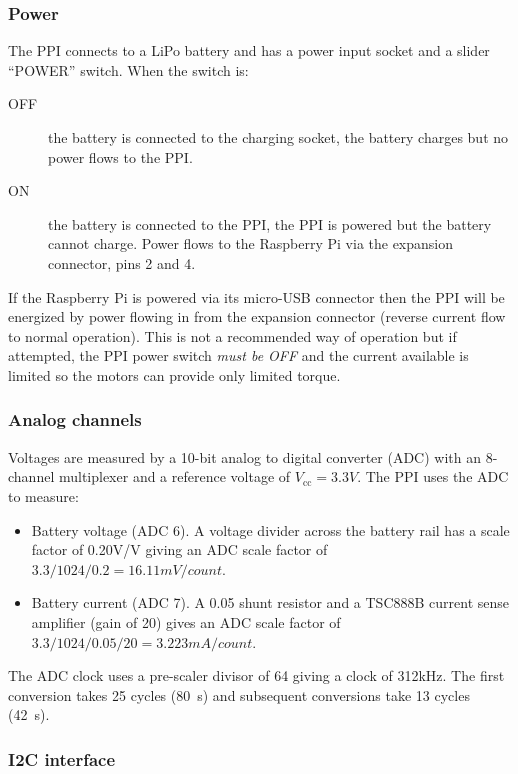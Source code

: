 \documentclass[11pt,fleqn]{article}
\begin{document}
\subsubsection{Power}
The PPI connects to a LiPo battery and has a power input socket and a slider ``POWER'' switch.
When the switch is:
\begin{description}
\item[OFF]  the battery is connected to the charging socket, the battery charges but no power flows to the PPI.
\item[ON]   the battery is connected to the PPI, the PPI is powered but the battery cannot charge.  Power flows to the Raspberry Pi via the expansion connector, pins 2 and 4.
\end{description}

If the Raspberry Pi is powered via its micro-USB connector then the PPI will  be energized by power flowing in from the expansion connector (reverse current flow to normal operation).
This is not a recommended way of operation but if attempted, the PPI power switch \emph{must be OFF} and the current available is limited so the motors can provide only limited torque.



\subsubsection{Analog channels}
Voltages are measured by a 10-bit analog to digital converter (ADC) with an 8-channel multiplexer and a reference voltage of $V_{\mbox{cc}} =3.3\unit{V}$.  The PPI uses the ADC to measure:
\begin{itemize}
\item Battery voltage (ADC 6). A voltage divider across the battery rail has a scale factor of 0.20\unit{V/V} giving an ADC scale factor of
$3.3/1024/0.2 = 16.11\unit{mV/count}$.
\item Battery current (ADC 7). A 0.05\unit{\Omega} shunt resistor and a TSC888B current sense amplifier (gain of 20) gives an ADC scale factor of $3.3/1024/0.05/20 = 3.223\unit{mA/count}$.
\end{itemize}

The ADC clock uses a pre-scaler divisor of 64 giving a clock of 312\unit{kHz}.  The first conversion takes 25 cycles (80\unit{\mu s}) and subsequent conversions take 13 cycles (42\unit{\mu s}).

\subsubsection{I2C interface}
\end{document}
